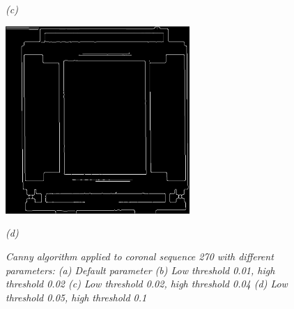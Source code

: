 \begin{figure}[htb]
\begin{minipage}[b]{2.75in}
    \centerline{\emph{(c)}}
  \end{minipage}\medskip
  \begin{minipage}[b]{2.75in}
    \centering
    \centerline{\mbox{\includegraphics[width=2.75in]{data_extraction/images/canny/0.05_0.1/20121017_270.eps}}}
    \centerline{\emph{(d)}}
  \end{minipage}
  \caption{\emph{Canny algorithm applied to coronal sequence 270 with different parameters: (a) Default parameter (b) Low threshold 0.01, high threshold  0.02 (c) Low threshold 0.02, high threshold  0.04 (d) Low threshold 0.05, high threshold  0.1}} \label{fig:canny_ct_270}
\end{figure}

